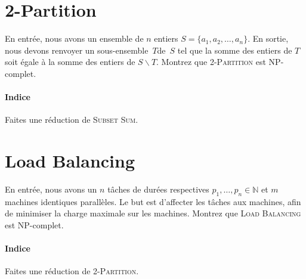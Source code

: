 \documentclass[12pt]{article}
\begin{document}
%
\section{2-Partition}
En entrée, nous avons un ensemble de $n$ entiers $S=\{a_1, a_2, \ldots, a_n\}$. En sortie, nous devons renvoyer 
un sous-ensemble~$T$de~$S$ tel que la somme des entiers de $T$ soit égale à la somme des entiers de $S\backslash T$.
Montrez que \textsc{2-Partition} est NP-complet.

\paragraph{Indice} 
Faites une réduction de \textsc{Subset Sum}.  


%

%
\section{Load Balancing}
En entrée, nous avons un $n$ tâches de durées respectives $p_1,\ldots,p_n\in \mathbb N$ et $m$ machines identiques parallèles.  Le but est d'affecter les tâches aux machines, afin de minimiser la charge maximale sur les machines.
Montrez que \textsc{Load Balancing} est NP-complet.

\paragraph{Indice} 
Faites une réduction de \textsc{2-Partition}.  

\end{document}
